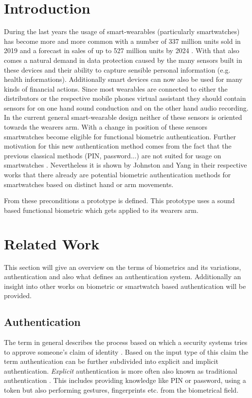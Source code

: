 \section{Introduction}
During the last years the usage of smart-wearables (particularly smartwatches) has become more and more common with a number of 337 million units sold in 2019 and a forecast in sales of up to 527 million units by 2024 \cite{tenzer}.
With that also comes a natural demand in data protection caused by the many sensors built in these devices and their ability to capture sensible personal information (e.g. health informations).
Additionally smart devices can now also be used for many kinds of financial actions.
Since most wearables are connected to either the distributors or the respective mobile phones virtual assistant they should contain sensors for on one hand sound conduction and on the other hand audio recording.
In the current general smart-wearable design neither of these sensors is oriented towards the wearers arm.
With a change in position of these sensors smartwatches become eligible for functional biometric authentication.
Further motivation for this new authentication method comes from the fact that the previous classical methods (PIN, password...) are not suited for usage on smartwatches \cite{xu2017gait}.   
Nevertheless it is shown by Johnston \cite{johnston2015smartwatch} and Yang \cite{yang2015motionauth} in their respective works that there already are potential biometric authentication methods for smartwatches based on distinct hand or arm movements. 

From these preconditions a prototype is defined. This prototype uses a sound based functional biometric which gets applied to its wearers arm. 

\section{Related Work}
This section will give an overview on the terms of biometrics and its variations, authentication and also what defines an authentication system.
Additionally an insight into other works on biometric or smartwatch based authentication will be provided. 

\subsection{Authentication}
The term in general describes the process based on which a security systems tries to approve someone's claim of identity \cite{bhattacharyya2009biometric}.
Based on the input type of this claim the term authentication can be further subdivided into explicit and implicit authentication.
\textit{Explicit} authentication is more often also known as traditional authentication \cite{ranjan2016automatic}.
This includes providing knowledge like PIN or password, using a token but also performing gestures, fingerprints etc. from the biometrical field.


